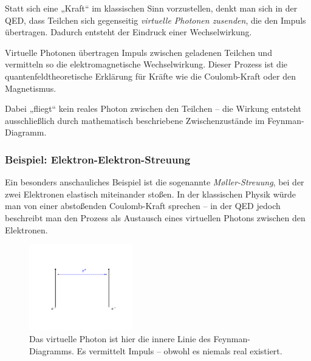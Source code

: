Statt sich eine „Kraft“ im klassischen Sinn vorzustellen, denkt man sich in der QED, dass Teilchen sich gegenseitig \emph{virtuelle Photonen zusenden}, die den Impuls übertragen. Dadurch entsteht der Eindruck einer Wechselwirkung. 
\vspace{1em}
\begin{tcolorbox}[physikbox, title=Virtuelle Photonen als Kraftvermittler]
	\label{box:Virtuelle Photonen als kraftvermittler}
	Virtuelle Photonen übertragen Impuls zwischen geladenen Teilchen und vermitteln so die elektromagnetische Wechselwirkung. Dieser Prozess ist die quantenfeldtheoretische Erklärung für Kräfte wie die Coulomb-Kraft oder den Magnetismus.
	
	Dabei „fliegt“ kein reales Photon zwischen den Teilchen – die Wirkung entsteht ausschließlich durch mathematisch beschriebene Zwischenzustände im Feynman-Diagramm.
\end{tcolorbox}

\subsubsection*{Beispiel: Elektron-Elektron-Streuung}
Ein besonders anschauliches Beispiel ist die sogenannte \emph{Møller-Streuung}, bei der zwei Elektronen elastisch miteinander stoßen. In der klassischen Physik würde man von einer abstoßenden Coulomb-Kraft sprechen – in der QED jedoch beschreibt man den Prozess als Austausch eines virtuellen Photons zwischen den Elektronen.
\begin{figure}[H]
	\begin{center}
		\includegraphics[width=0.4\textwidth]{bilder/moeller-diagramm.pdf}
	\end{center}
	\caption{Das virtuelle Photon ist hier die innere Linie des Feynman-Diagramms. Es vermittelt Impuls – obwohl es niemals real existiert.}
\end{figure}

